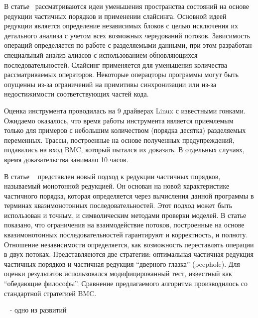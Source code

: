 В статье~\cite{Kahlon:2009:SRTI} рассматриваются идеи уменьшения пространства состояний на основе редукции частичных порядков и применении слайсинга. Основной идеей редукции является определение независимых блоков с целью исключения их детального анализа с учетом всех возможных чередований потоков. Зависимость операций определяется по работе с разделяемыми данными, при этом разработан специальный анализ алиасов с использованием обновляющихся последовательностей.
Слайсинг применяется для уменьшения количества рассматриваемых операторов. Некоторые операцторы программы могут быть опущенны из-за ограничений на примитивы синхронизации или из-за недостижимости соответствующих частей кода.

Оценка инструмента проводилась на 9 драйверах Linux с известными гонками. Ожидаемо оказалось, что время работы инструмента является приемлемым только для примеров с небольшим количеством (порядка десятка) разделяемых переменных. Трассы, построенные на основе полученных предупреждений, подавались на вход BMC, который пытался их доказать. В отдельных случаях, время доказательства занимало 10 часов. 

В статье ~\cite{Kahlon:2009} представлен новый подход к редукции частичных порядков, называемый монотонной редукцией. Он основан на новой характеристике частичного порядка, которая определяется через вычисления данной программы в терминах квазимонотонных последовательностей. Этот подход может быть использован и точным, и символическим методами проверки моделей. В статье показано, что ограничения на взаимодействие потоков, построенные на основе квазимонотонных последовательностей гарантируют и корректность, и полноту. 
Отношение независимости определяется, как возможность переставлять операции в двух потоках. Представляеются две стратегии: оптимальная частичная редукция частичных порядков и частичная редукция “дверного глазка” (peephole).
Для оценки результатов использовался модифицированный тест, известный как “обедающие философы”. Сравнение предлагаемого алгоритма производилось со стандартной стратегией BMC.

~\cite{Abdulla:2014:POPL, Abdulla:2014} - одно из развитий

